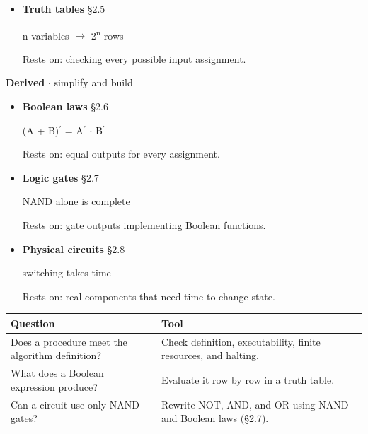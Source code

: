 \documentclass[11pt]{article}
\begin{document}
\begin{keepsection}
\begin{itemize}
\ensuremath{\neg} \ensuremath{\cdot} \ensuremath{\land} \ensuremath{\cdot} \ensuremath{\lor}

Rests on: defined operations over the two truth values.
\item {}
\textbf{Truth tables} \hfill{\small\color{FAUblue}§2.5}

n variables \ensuremath{\to} 2\textsuperscript{n} rows

Rests on: checking every possible input assignment.
\end{itemize}

\textbf{Derived} \ensuremath{\cdot} simplify and build

\begin{itemize}
\item {}
\textbf{Boolean laws} \hfill{\small\color{FAUblue}§2.6}

(A + B)\ensuremath{{}^{\prime}} = A\ensuremath{{}^{\prime}} \ensuremath{\cdot} B\ensuremath{{}^{\prime}}

Rests on: equal outputs for every assignment.
\item {}
\textbf{Logic gates} \hfill{\small\color{FAUblue}§2.7}

NAND alone is complete

Rests on: gate outputs implementing Boolean functions.
\item {}
\textbf{Physical circuits} \hfill{\small\color{FAUblue}§2.8}

switching takes time

Rests on: real components that need time to change state.
\end{itemize}

\begin{center}\small\begin{tabularx}{\linewidth}{>{\raggedright\arraybackslash}X>{\raggedright\arraybackslash}X}\toprule
\textbf{Question} & \textbf{Tool} \\ \midrule
Does a procedure meet the algorithm definition? & Check definition, executability, finite resources, and halting. \\
What does a Boolean expression produce? & Evaluate it row by row in a truth table. \\
Can a circuit use only NAND gates? & Rewrite NOT, AND, and OR using NAND and Boolean laws (§2.7). \\
\bottomrule\end{tabularx}\end{center}
\end{keepsection}
\end{document}
